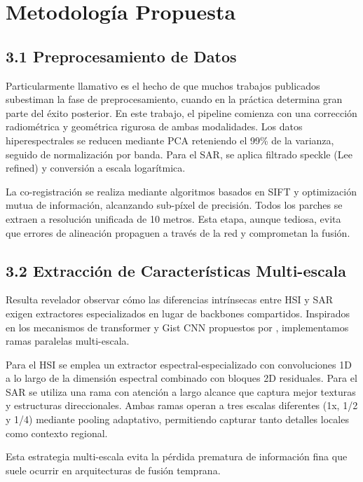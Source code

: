 \section{Metodología Propuesta}

\subsection{3.1 Preprocesamiento de Datos}

Particularmente llamativo es el hecho de que muchos trabajos publicados subestiman la fase de preprocesamiento, cuando en la práctica determina gran parte del éxito posterior. En este trabajo, el pipeline comienza con una corrección radiométrica y geométrica rigurosa de ambas modalidades. Los datos hiperespectrales se reducen mediante PCA reteniendo el 99\% de la varianza, seguido de normalización por banda. Para el SAR, se aplica filtrado speckle (Lee refined) y conversión a escala logarítmica.

La co-registración se realiza mediante algoritmos basados en SIFT y optimización mutua de información, alcanzando sub-píxel de precisión. Todos los parches se extraen a resolución unificada de 10 metros. Esta etapa, aunque tediosa, evita que errores de alineación propaguen a través de la red y comprometan la fusión.

\subsection{3.2 Extracción de Características Multi-escala}

Resulta revelador observar cómo las diferencias intrínsecas entre HSI y SAR exigen extractores especializados en lugar de backbones compartidos. Inspirados en los mecanismos de transformer y Gist CNN propuestos por \cite{Wang2025TGF}, implementamos ramas paralelas multi-escala. 

Para el HSI se emplea un extractor espectral-especializado con convoluciones 1D a lo largo de la dimensión espectral combinado con bloques 2D residuales. Para el SAR se utiliza una rama con atención a largo alcance que captura mejor texturas y estructuras direccionales. Ambas ramas operan a tres escalas diferentes (1x, 1/2 y 1/4) mediante pooling adaptativo, permitiendo capturar tanto detalles locales como contexto regional. 

Esta estrategia multi-escala evita la pérdida prematura de información fina que suele ocurrir en arquitecturas de fusión temprana.

